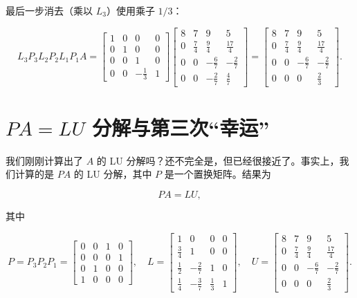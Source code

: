 \documentclass[UTF8,fontset=none,12pt]{ctexart}
\theoremstyle{definition}
\begin{document}
最后一步消去（乘以 $L_3$）使用乘子 $1/3$：

$$
L_3P_3L_2P_2L_1P_1A=
\begin{bmatrix}
1&0&0&0\\
0&1&0&0\\
0&0&1&0\\
0&0&-\frac13&1
\end{bmatrix}
\begin{bmatrix}
8&7&9&5\\
0&\frac74&\frac94&\frac{17}4\\
0&0&-\frac67&-\frac27\\
0&0&-\frac27&\frac47
\end{bmatrix}
=
\begin{bmatrix}
8&7&9&5\\
0&\frac74&\frac94&\frac{17}4\\
0&0&-\frac67&-\frac27\\
0&0&0&\frac23
\end{bmatrix}.
$$

\section*{$PA=LU$ 分解与第三次“幸运”}

我们刚刚计算出了 $A$ 的 LU 分解吗？还不完全是，但已经很接近了。事实上，我们计算的是 $PA$ 的 LU 分解，其中 $P$ 是一个置换矩阵。结果为

\begin{equation}
P A=L U,
\tag{21.3}
\end{equation}

其中

$$
P=P_3P_2P_1=
\begin{bmatrix}
0&0&1&0\\
0&0&0&1\\
0&1&0&0\\
1&0&0&0
\end{bmatrix},
\quad
L=
\begin{bmatrix}
1&0&0&0\\
\frac34&1&0&0\\
\frac12&-\frac27&1&0\\
\frac14&-\frac37&\frac13&1
\end{bmatrix},
\quad
U=
\begin{bmatrix}
8&7&9&5\\
0&\frac74&\frac94&\frac{17}4\\
0&0&-\frac67&-\frac27\\
0&0&0&\frac23
\end{bmatrix}.
$$
\end{document}

